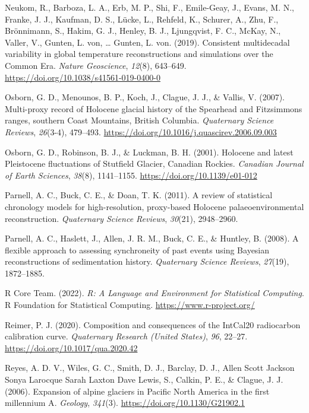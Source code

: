 \documentclass[
  letterpaper,
  DIV=11,
  numbers=noendperiod]{scrartcl}
\newlength{\cslhangindent}
\newenvironment{CSLReferences}[2] %
 {\begin{list}{}{%
  \setlength{\itemindent}{0pt}
  \setlength{\leftmargin}{0pt}
  \setlength{\parsep}{0pt}
  \ifodd #1
   \setlength{\leftmargin}{\cslhangindent}
   \setlength{\itemindent}{-1\cslhangindent}
  \fi
  \setlength{\itemsep}{#2\baselineskip}}}
 {\end{list}}
\begin{document}
\begin{CSLReferences}{1}{0}
Neukom, R., Barboza, L. A., Erb, M. P., Shi, F., Emile-Geay, J., Evans,
M. N., Franke, J. J., Kaufman, D. S., Lücke, L., Rehfeld, K., Schurer,
A., Zhu, F., Brönnimann, S., Hakim, G. J., Henley, B. J., Ljungqvist, F.
C., McKay, N., Valler, V., Gunten, L. von, \ldots{} Gunten, L. von.
(2019). {Consistent multidecadal variability in global temperature
reconstructions and simulations over the Common Era}. \emph{Nature
Geoscience}, \emph{12}(8), 643--649.
\url{https://doi.org/10.1038/s41561-019-0400-0}

Osborn, G. D., Menounos, B. P., Koch, J., Clague, J. J., \& Vallis, V.
(2007). {Multi-proxy record of Holocene glacial history of the Spearhead
and Fitzsimmons ranges, southern Coast Mountains, British Columbia}.
\emph{Quaternary Science Reviews}, \emph{26}(3-4), 479--493.
\url{https://doi.org/10.1016/j.quascirev.2006.09.003}

Osborn, G. D., Robinson, B. J., \& Luckman, B. H. (2001). {Holocene and
latest Pleistocene fluctuations of Stutfield Glacier, Canadian Rockies}.
\emph{Canadian Journal of Earth Sciences}, \emph{38}(8), 1141--1155.
\url{https://doi.org/10.1139/e01-012}

Parnell, A. C., Buck, C. E., \& Doan, T. K. (2011). {A review of
statistical chronology models for high-resolution, proxy-based Holocene
palaeoenvironmental reconstruction}. \emph{Quaternary Science Reviews},
\emph{30}(21), 2948--2960.

Parnell, A. C., Haslett, J., Allen, J. R. M., Buck, C. E., \& Huntley,
B. (2008). {A flexible approach to assessing synchroneity of past events
using Bayesian reconstructions of sedimentation history}.
\emph{Quaternary Science Reviews}, \emph{27}(19), 1872--1885.

R Core Team. (2022). \emph{{R: A Language and Environment for
Statistical Computing}}. R Foundation for Statistical Computing.
\url{https://www.r-project.org/}

Reimer, P. J. (2020). {Composition and consequences of the IntCal20
radiocarbon calibration curve}. \emph{Quaternary Research (United
States)}, \emph{96}, 22--27. \url{https://doi.org/10.1017/qua.2020.42}

Reyes, A. D. V., Wiles, G. C., Smith, D. J., Barclay, D. J., Allen Scott
Jackson Sonya Larocque Sarah Laxton Dave Lewis, S., Calkin, P. E., \&
Clague, J. J. (2006). {Expansion of alpine glaciers in Pacific North
America in the first millennium A}. \emph{Geology}, \emph{341}(3).
\url{https://doi.org/10.1130/G21902.1}


\end{CSLReferences}
\end{document}

